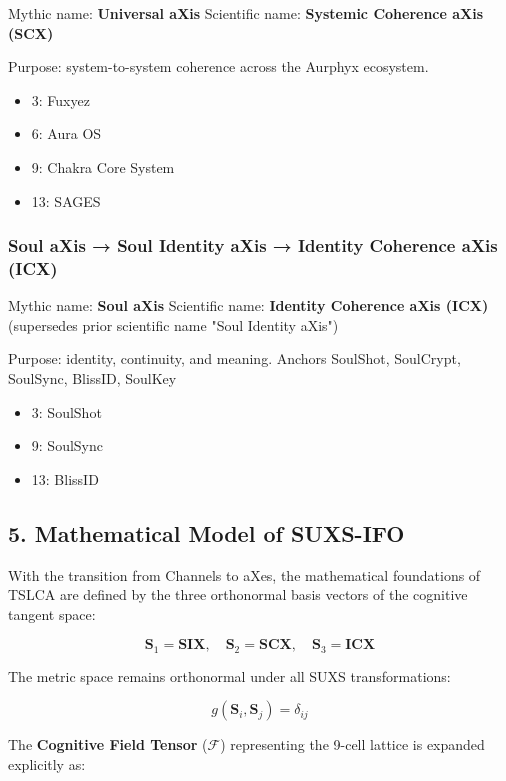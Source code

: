 Mythic name: \textbf{Universal aXis} Scientific name: \textbf{Systemic Coherence aXis (SCX)}

Purpose: system-to-system coherence across the Aurphyx ecosystem.

\begin{itemize}
\tightlist
\item
  3: Fuxyez
\item
  6: Aura OS
\item
  9: Chakra Core System
\item
  13: SAGES
\end{itemize}

\subsubsection{Soul aXis → Soul Identity aXis → Identity Coherence aXis (ICX)}\label{soul-axis-soul-identity-axis-icx}

Mythic name: \textbf{Soul aXis} Scientific name: \textbf{Identity Coherence aXis (ICX)} (supersedes prior scientific name "Soul Identity aXis")

Purpose: identity, continuity, and meaning. Anchors SoulShot, SoulCrypt, SoulSync, BlissID, SoulKey

\begin{itemize}
\tightlist
\item
  3: SoulShot
\item
  9: SoulSync
\item
  13: BlissID
\end{itemize}

\subsection{5. Mathematical Model of SUXS-IFO}\label{mathematical-model-of-suxs-ifo}

With the transition from Channels to aXes, the mathematical foundations of TSLCA are defined by the three orthonormal basis vectors of the cognitive tangent space:

\[
\mathbf{S}_1 = \mathbf{SIX},\quad \mathbf{S}_2 = \mathbf{SCX},\quad \mathbf{S}_3 = \mathbf{ICX}
\]

The metric space remains orthonormal under all SUXS transformations:

\[
g(\mathbf{S}_i,\mathbf{S}_j)=\delta_{ij}
\]

The \textbf{Cognitive Field Tensor} (\(\mathcal{F}\)) representing the 9-cell lattice is expanded explicitly as:

